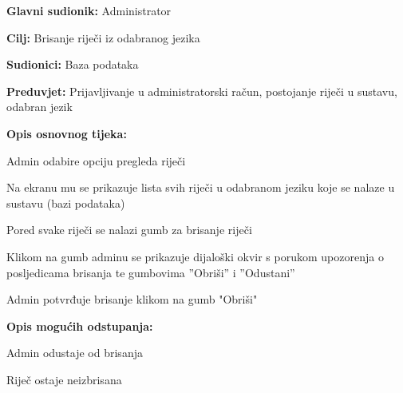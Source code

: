 \noindent {}
\begin{packed_item}

	\item \textbf{Glavni sudionik: } Administrator
	\item \textbf{Cilj: } Brisanje riječi iz odabranog jezika
	\item \textbf{Sudionici: } Baza podataka
	\item \textbf{Preduvjet: } Prijavljivanje u administratorski račun, postojanje riječi u sustavu, odabran jezik
	\item  \textbf{Opis osnovnog tijeka:}
	
	\item[] \begin{packed_enum}
		
		\item Admin odabire opciju pregleda riječi
		\item Na ekranu mu se prikazuje lista svih riječi u odabranom jeziku koje se nalaze u sustavu (bazi podataka)
		\item Pored svake riječi se nalazi gumb za brisanje riječi
		\item Klikom na gumb adminu se prikazuje dijaloški okvir s porukom upozorenja o posljedicama brisanja te gumbovima ”Obriši” i ”Odustani”
		\item Admin potvrđuje brisanje klikom na gumb "Obriši"

	\end{packed_enum}

	\item  \textbf{Opis mogućih odstupanja:}
	
	\item[] \begin{packed_item}

		\item[5.a] Admin odustaje od brisanja
		\item[] \begin{packed_enum}
			
			\item Riječ ostaje neizbrisana
			
		\end{packed_enum}
		
	\end{packed_item}
	
\end{packed_item}


